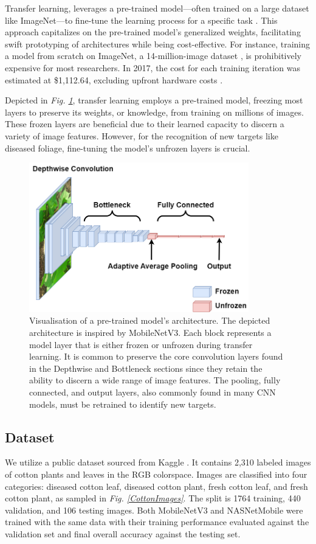 \documentclass[conference]{IEEEtran}
\begin{document}
Transfer learning, leverages a pre-trained model—often trained on a large dataset like ImageNet—to fine-tune the learning process for a specific task \cite{Shu}. This approach capitalizes on the pre-trained model's generalized weights, facilitating swift prototyping of architectures while being cost-effective. For instance, training a model from scratch on ImageNet, a 14-million-image dataset \cite{Reynolds}, is prohibitively expensive for most researchers. In 2017, the cost for each training iteration was estimated at \$1,112.64, excluding upfront hardware costs \cite{genuineimpact}.

Depicted in \emph{Fig. \ref{Transfer Learning}}, transfer learning employs a pre-trained model, freezing most layers to preserve its weights, or knowledge, from training on millions of images. These frozen layers are beneficial due to their learned capacity to discern a variety of image features. However, for the recognition of new targets like diseased foliage, fine-tuning the model's unfrozen layers is crucial.

\begin{figure}[h]
\centerline{\includegraphics[height=6.5cm, width=1\linewidth]{Images/MobileNetV3_layers.drawio.png}}
\caption{Visualisation of a pre-trained model's architecture. The depicted architecture is inspired by MobileNetV3. Each block represents a model layer that is either frozen or unfrozen during transfer learning. It is common to preserve the core convolution layers found in the Depthwise and Bottleneck sections since they retain the ability to discern a wide range of image features. The pooling, fully connected, and output layers, also commonly found in many CNN models, must be retrained to identify new targets.}
\label{Transfer Learning}
\end{figure}

\subsection{Dataset}
We utilize a public dataset sourced from Kaggle \cite{Kaggle}. It contains 2,310 labeled images of cotton plants and leaves in the RGB colorspace. Images are classified into four categories: diseased cotton leaf, diseased cotton plant, fresh cotton leaf, and fresh cotton plant, as sampled in \emph{Fig. \ref{CottonImages}}. The split is 1764 training, 440 validation, and 106 testing images.  Both MobileNetV3 and NASNetMobile were trained with the same data with their training performance evaluated against the validation set and final overall accuracy against the testing set. 
\end{document}
